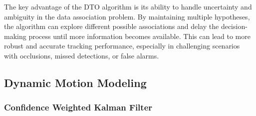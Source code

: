 


 

The key advantage of the DTO algorithm is its ability to handle uncertainty and ambiguity in the data association problem. By maintaining multiple hypotheses, the algorithm can explore different possible associations and delay the decision-making process until more information becomes available. This can lead to more robust and accurate tracking performance, especially in challenging scenarios with occlusions, missed detections, or false alarms.


\subsection{Dynamic Motion Modeling} \subsubsection{Confidence Weighted Kalman Filter}

